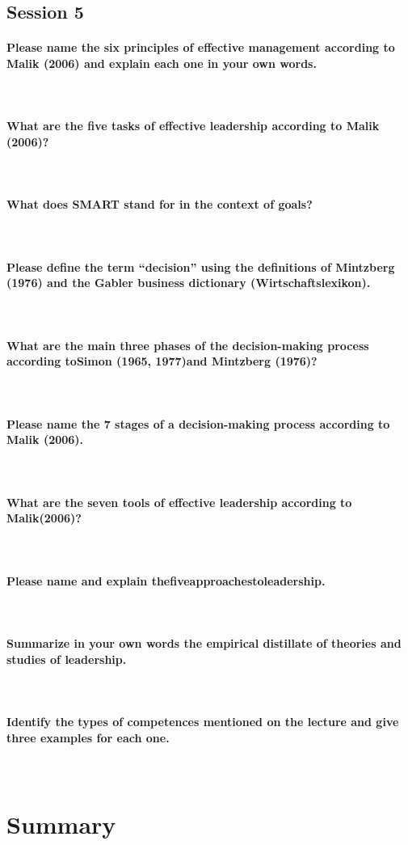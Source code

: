 \documentclass[10pt,a4paper,noendnumber=true]{scrartcl}
\newcommand{\properparagraph}[1]{\paragraph{\textcolor{Emerald}{#1}}\mbox{}\\}
\begin{document}
\subsection{Session 5}
\properparagraph{Please name the six principles of effective management according to Malik (2006) and explain each one in your own words.}
\properparagraph{What are the five tasks of effective leadership according to Malik (2006)?}
\properparagraph{What does SMART stand for in the context of goals?}
\properparagraph{Please define the term "`decision"' using the definitions of Mintzberg (1976) and the Gabler business dictionary (Wirtschaftslexikon).}
\properparagraph{What are the main three phases of the decision-making process according toSimon (1965, 1977)and Mintzberg (1976)?}
\properparagraph{Please name the 7 stages of a decision-making process according to Malik (2006).}
\properparagraph{What are the seven tools of effective leadership according to Malik(2006)?}
\properparagraph{Please name and explain thefiveapproachestoleadership.}
\properparagraph{Summarize in your own words the empirical distillate of theories and studies of leadership.}
\properparagraph{Identify the types of competences mentioned on the lecture and give three examples for each one.}

\newpage

\section{Summary}
\end{document}
